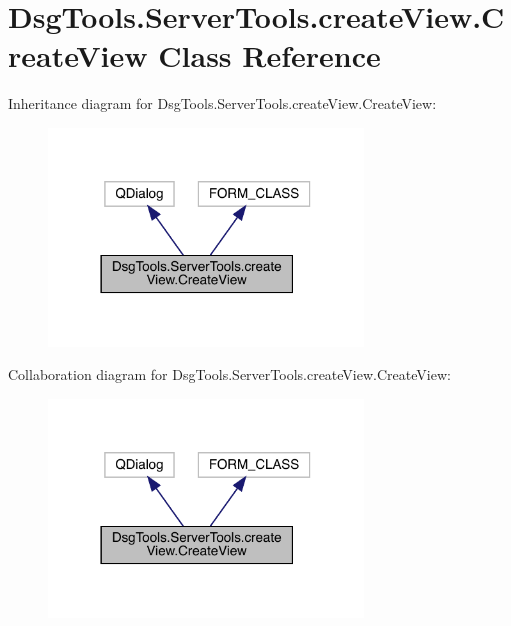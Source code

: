 \hypertarget{class_dsg_tools_1_1_server_tools_1_1create_view_1_1_create_view}{}\section{Dsg\+Tools.\+Server\+Tools.\+create\+View.\+Create\+View Class Reference}
\label{class_dsg_tools_1_1_server_tools_1_1create_view_1_1_create_view}


Inheritance diagram for Dsg\+Tools.\+Server\+Tools.\+create\+View.\+Create\+View\+:
\nopagebreak
\begin{figure}[H]
\begin{center}
\leavevmode
\includegraphics[width=237pt]{class_dsg_tools_1_1_server_tools_1_1create_view_1_1_create_view__inherit__graph}
\end{center}
\end{figure}


Collaboration diagram for Dsg\+Tools.\+Server\+Tools.\+create\+View.\+Create\+View\+:
\nopagebreak
\begin{figure}[H]
\begin{center}
\leavevmode
\includegraphics[width=237pt]{class_dsg_tools_1_1_server_tools_1_1create_view_1_1_create_view__coll__graph}
\end{center}
\end{figure}
